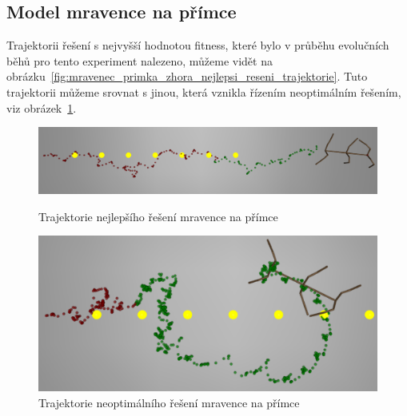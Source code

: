 \clearpage


\subsection{Model mravence na přímce}
Trajektorii řešení s nejvyšší hodnotou fitness, které bylo v průběhu evolučních běhů pro tento experiment nalezeno, můžeme vidět na obrázku~\ref{fig:mravenec_primka_zhora_nejlepsi_reseni_trajektorie}.
Tuto trajektorii můžeme srovnat s jinou, která vznikla řízením neoptimálním řešením, viz obrázek~\ref{fig:mravenec_primka_zhora_neoptimalni_reseni_trajektorie}.



\begin{figure}[h]
    \begin{minipage}[c]{0.48\linewidth}
        \includegraphics[width=\linewidth]{obrazky/mravenec_primka_zhora_nejlepsi_reseni_trajektorie.png}
        \caption{Trajektorie nejlepšího řešení mravence na přímce}
        \label{fig:mravenec_primka_zhora_nejlepsi_reseni_trajektorie}
    \end{minipage}
    \hfill
    \begin{minipage}[c]{0.48\linewidth}
        \includegraphics[width=\linewidth]{obrazky/mravenec_zhora_neoptimalni_reseni_trajektorie.png}
        \caption{Trajektorie neoptimálního řešení mravence na přímce}
        \label{fig:mravenec_primka_zhora_neoptimalni_reseni_trajektorie}
    \end{minipage}
\end{figure}

